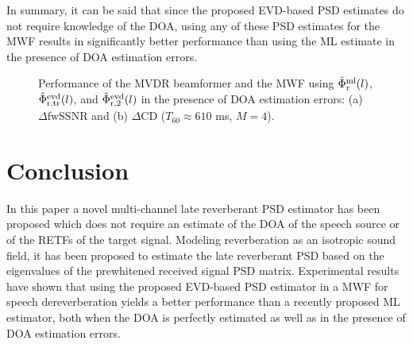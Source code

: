 \documentclass{article}
\begin{document}
In summary, it can be said that since the proposed EVD-based PSD estimates do not require knowledge of the DOA, using any of these PSD estimates for the MWF results in significantly better performance than using the ML estimate in the presence of DOA estimation errors.

\begin{figure}[t!]


\caption{Performance of the MVDR beamformer and the MWF using $\hat{\Phi}^{\rm ml}_{\rm r}(l)$, $\hat{\Phi}^{\rm evd}_{\rm r, tr}(l)$, and $\hat{\Phi}^{\rm evd}_{\rm r, 2}(l)$ in the presence of DOA estimation errors: (a)~$\Delta$fwSSNR and (b) $\Delta$CD ($T_{60} \approx 610$ ms, $M = 4$).}
\label{fig: err}
\end{figure}


\section{Conclusion}
In this paper a novel multi-channel late reverberant PSD estimator has been proposed which does not require an estimate of the DOA of the speech source or of the RETFs of the target signal. 
Modeling reverberation as an isotropic sound field, it has been proposed to estimate the late reverberant PSD based on the eigenvalues of the prewhitened received signal PSD matrix.
Experimental results have shown that using the proposed EVD-based PSD estimator in a MWF for speech dereverberation yields a better performance than a recently proposed ML estimator, both when the DOA is perfectly estimated as well as in the presence of DOA estimation errors.


\end{document}
